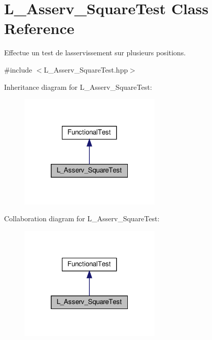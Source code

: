 \hypertarget{classL__Asserv__SquareTest}{}\section{L\+\_\+\+Asserv\+\_\+\+Square\+Test Class Reference}
\label{classL__Asserv__SquareTest}


Effectue un test de l\textquotesingle{}asservissement sur plusieurs positions.  




{\ttfamily \#include $<$L\+\_\+\+Asserv\+\_\+\+Square\+Test.\+hpp$>$}



Inheritance diagram for L\+\_\+\+Asserv\+\_\+\+Square\+Test\+:
\nopagebreak
\begin{figure}[H]
\begin{center}
\leavevmode
\includegraphics[width=193pt]{classL__Asserv__SquareTest__inherit__graph}
\end{center}
\end{figure}


Collaboration diagram for L\+\_\+\+Asserv\+\_\+\+Square\+Test\+:
\nopagebreak
\begin{figure}[H]
\begin{center}
\leavevmode
\includegraphics[width=193pt]{classL__Asserv__SquareTest__coll__graph}
\end{center}
\end{figure}
